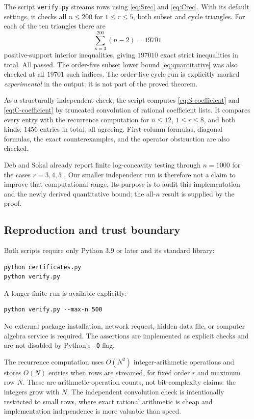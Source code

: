 \documentclass[11pt,a4paper]{article}
\numberwithin{equation}{section}
\theoremstyle{definition}
\theoremstyle{remark}
\begin{document}
The script \texttt{verify.py} streams rows using \eqref{eq:Srec} and
\eqref{eq:Crec}. With its default settings, it checks all $n\le200$ for
$1\le r\le5$, both subset and cycle triangles. For each of the ten
triangles there are
\[
 \sum_{n=3}^{200}(n-2)=19701
\]
positive-support interior inequalities, giving $197010$ exact strict
inequalities in total. All passed. The order-five subset lower bound
\eqref{eq:quantitative} was also checked at all $19701$ such indices.
The order-five cycle run is explicitly marked \emph{experimental} in the
output; it is not part of the proved theorem.

As a structurally independent check, the script computes
\eqref{eq:S-coefficient} and \eqref{eq:C-coefficient} by truncated
convolution of rational coefficient lists. It compares every entry with
the recurrence computation for $n\le12$, $1\le r\le8$, and both kinds:
$1456$ entries in total, all agreeing. First-column formulas, diagonal
formulas, the exact counterexamples, and the operator obstruction are
also checked.

Deb and Sokal already report finite log-concavity testing through
$n=1000$ for the cases $r=3,4,5$ \cite[Appendix~C, Tables~1--2]{DebSokal}.
Our smaller independent run is therefore not a claim to improve that
computational range. Its purpose is to audit this implementation and the
newly derived quantitative bound; the all-$n$ result is supplied by the
proof.

\subsection{Reproduction and trust boundary}

Both scripts require only Python 3.9 or later and its standard library:
\begin{lstlisting}
python certificates.py
python verify.py
\end{lstlisting}
A longer finite run is available explicitly:
\begin{lstlisting}
python verify.py --max-n 500
\end{lstlisting}
No external package installation, network request, hidden data file, or
computer algebra service is required. The assertions are implemented as
explicit checks and are not disabled by Python's \texttt{-O} flag.

The recurrence computation uses $O(N^2)$ integer-arithmetic operations and
stores $O(N)$ entries when rows are streamed, for fixed order $r$ and
maximum row $N$. These are arithmetic-operation counts, not bit-complexity
claims: the integers grow with $N$. The independent convolution check is
intentionally restricted to small rows, where exact rational arithmetic is
cheap and implementation independence is more valuable than speed.
\end{document}
